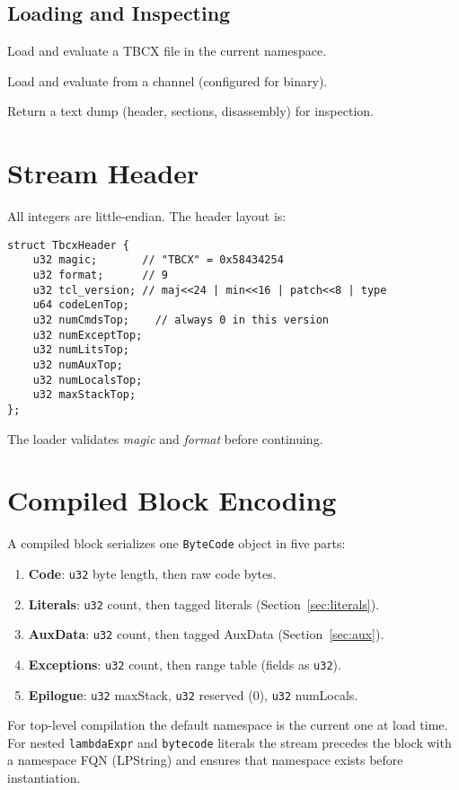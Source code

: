 \documentclass[11pt,a4paper]{article}
\begin{document}
\subsection{Loading and Inspecting}
\begin{description}[style=nextline]
  \item[\texttt{tbcx::loadfile \emph{in.tbcx}}] Load and evaluate a TBCX file in the current namespace.
  \item[\texttt{tbcx::loadchan \emph{channelName}}] Load and evaluate from a channel (configured for binary).
  \item[\texttt{tbcx::dumpfile \emph{filename}}] Return a text dump (header, sections, disassembly) for inspection.
\end{description}

\section{Stream Header}
All integers are little-endian. The header layout is:
\begin{verbatim}
struct TbcxHeader {
    u32 magic;       // "TBCX" = 0x58434254
    u32 format;      // 9
    u32 tcl_version; // maj<<24 | min<<16 | patch<<8 | type
    u64 codeLenTop;
    u32 numCmdsTop;    // always 0 in this version
    u32 numExceptTop;
    u32 numLitsTop;
    u32 numAuxTop;
    u32 numLocalsTop;
    u32 maxStackTop;
};
\end{verbatim}
The loader validates \emph{magic} and \emph{format} before continuing.

\section{Compiled Block Encoding}
A compiled block serializes one \texttt{ByteCode} object in five parts:
\begin{enumerate}[nosep]
  \item \textbf{Code}: \texttt{u32} byte length, then raw code bytes.
  \item \textbf{Literals}: \texttt{u32} count, then tagged literals (Section~\ref{sec:literals}).
  \item \textbf{AuxData}: \texttt{u32} count, then tagged AuxData (Section~\ref{sec:aux}).
  \item \textbf{Exceptions}: \texttt{u32} count, then range table (fields as \texttt{u32}).
  \item \textbf{Epilogue}: \texttt{u32} maxStack, \texttt{u32} reserved (0), \texttt{u32} numLocals.
\end{enumerate}
For top-level compilation the default namespace is the current one at load time. For nested
\texttt{lambdaExpr} and \texttt{bytecode} literals the stream precedes the block with a namespace FQN
(LPString) and ensures that namespace exists before instantiation.
\end{document}
